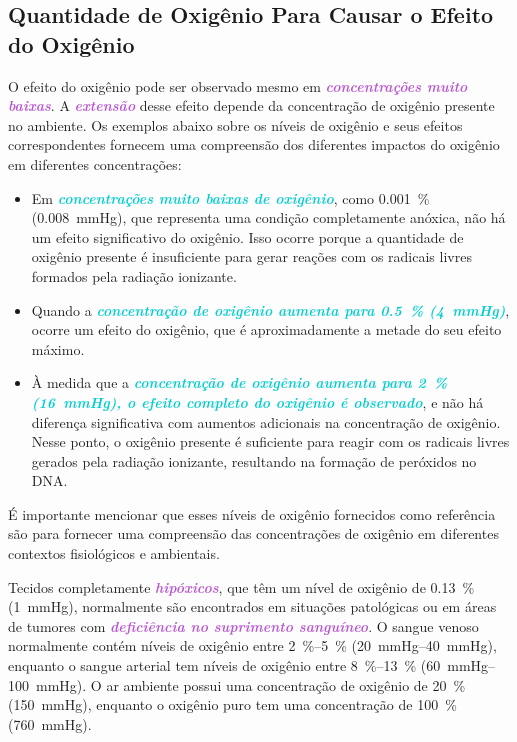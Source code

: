\documentclass[11pt,a4paper]{article}
\newcounter{exemplo}
\begin{document}
\subsection*{Quantidade de Oxigênio Para Causar o Efeito do Oxigênio}

	O efeito do oxigênio pode ser observado mesmo em \textcolor{MediumOrchid}{\textbf{\textit{concentrações muito baixas}}}. A \textcolor{MediumOrchid}{\textbf{\textit{extensão}}} desse efeito depende da concentração de oxigênio presente no ambiente. Os exemplos abaixo sobre os níveis de oxigênio e seus efeitos correspondentes fornecem uma compreensão dos diferentes impactos do oxigênio em diferentes concentrações:

	\begin{exemplo}
		\begin{itemize}[label=\textcolor{CarnationPink}{$\blacktriangleright$}]
			\item Em \textcolor{DarkTurquoise}{\textbf{\textit{concentrações muito baixas de oxigênio}}}, como \SI{0.001}{\percent} (\SI{0.008}{\mmHg}), que representa uma condição completamente anóxica, não há um efeito significativo do oxigênio. Isso ocorre porque a quantidade de oxigênio presente é insuficiente para gerar reações com os radicais livres formados pela radiação ionizante.

			\item  Quando a \textcolor{DarkTurquoise}{\textbf{\textit{concentração de oxigênio aumenta para \SI{0.5}{\percent} (\SI{4}{\mmHg})}}}, ocorre um efeito do oxigênio, que é aproximadamente a metade do seu efeito máximo. 
			
			\item À medida que a \textcolor{DarkTurquoise}{\textbf{\textit{concentração de oxigênio aumenta para \SI{2}{\percent} (\SI{16}{\mmHg}), o efeito completo do oxigênio é observado}}}, e não há diferença significativa com aumentos adicionais na concentração de oxigênio. Nesse ponto, o oxigênio presente é suficiente para reagir com os radicais livres gerados pela radiação ionizante, resultando na formação de peróxidos no DNA.
		\end{itemize}
	\end{exemplo}
	
	É importante mencionar que esses níveis de oxigênio fornecidos como referência são para fornecer uma compreensão das concentrações de oxigênio em diferentes contextos fisiológicos e ambientais. 
	
	Tecidos completamente \textcolor{MediumOrchid}{\textbf{\textit{hipóxicos}}}, que têm um nível de oxigênio de \SI{0.13}{\percent} (\SI{1}{\mmHg}), normalmente são encontrados em situações patológicas ou em áreas de tumores com \textcolor{MediumOrchid}{\textbf{\textit{deficiência no suprimento sanguíneo}}}. O sangue venoso normalmente contém níveis de oxigênio entre \SIrange{2}{5}{\percent} (\SIrange{20}{40}{\mmHg}), enquanto o sangue arterial tem níveis de oxigênio entre \SIrange{8}{13}{\percent} (\SIrange{60}{100}{\mmHg}). O ar ambiente possui uma concentração de oxigênio de \SI{20}{\percent} (\SI{150}{\mmHg}), enquanto o oxigênio puro tem uma concentração de \SI{100}{\percent} (\SI{760}{\mmHg}).
\end{document}
